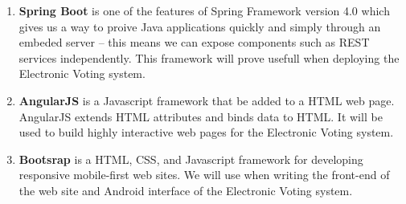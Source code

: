 \begin{enumerate}

		\item \textbf{Spring Boot} is one of the features of Spring Framework version 4.0 which gives us a way to proive Java applications quickly and simply through an embeded server – this means we can expose components such as REST services independently. This framework will prove usefull when deploying the Electronic Voting system. 
		
		\item \textbf{AngularJS} is a Javascript framework that be added to a HTML web page. AngularJS extends HTML attributes and binds data to HTML. It will be used to build highly interactive web pages for the Electronic Voting system. 
		
		\item \textbf{Bootsrap} is a HTML, CSS, and Javascript framework for developing responsive mobile-first web sites. We will use when writing the front-end of the web site and Android interface of the Electronic Voting system. 
		
		
\end{enumerate} 